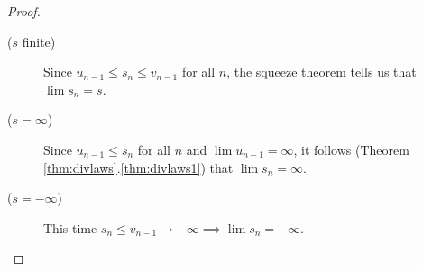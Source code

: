 \begin{proof}
		\begin{description}
			\item[\normalfont($s$ finite)\lstsp] Since $u_{n-1}\le s_n\le v_{n-1}$ for all $n$, the squeeze theorem tells us that $\lim s_n=s$.
			\item[\normalfont($s=\infty$)\lstsp] Since $u_{n-1}\le s_n$ for all $n$ and $\lim u_{n-1}=\infty$, it follows (Theorem \ref*{thm:divlaws}.\ref{thm:divlaws1}) that $\lim s_n=\infty$.
			\item[\normalfont($s=-\infty$)\lstsp] This time $s_n\le v_{n-1}\to-\infty\implies\lim s_n=-\infty$.\qedhere
		\end{description}

% 	

\end{proof}
